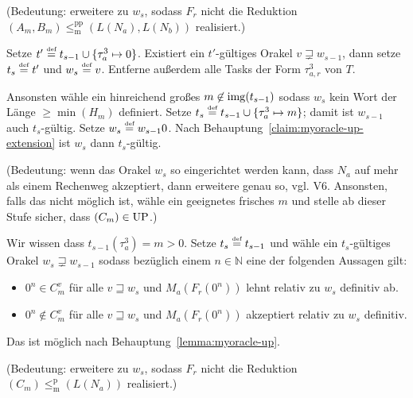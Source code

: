 \begin{description}[leftmargin=\parindent]
        (Bedeutung: erweitere zu $w_s$, sodass $F_r$ nicht die Reduktion $(A_m, B_m)\!\leq_\mathrm{m}^\mathrm{pp}\! (L(N_a), L(N_b))$ realisiert.) 

    \item[Task $\tau^3_{a}$:] Setze $t'\stackrel{\text{{\normalfont\tiny def}}}{=} t_{s-1}\cup\{\tau^3_{a}\mapsto 0\}$. Existiert ein $t'$-gültiges Orakel $v\sqsupsetneq w_{s-1}$, dann setze $t_s\stackrel{\text{{\normalfont\tiny def}}}{=} t'$ und $w_s\stackrel{\text{{\normalfont\tiny def}}}{=} v$. Entferne außerdem alle Tasks der Form $\tau^3_{a,r}$ von $T$.

    Ansonsten wähle ein hinreichend großes $m\not\in \operatorname{img}(t_{s-1})$ sodass $w_s$ kein Wort der Länge $\geq\min(H_m)$ definiert. Setze $t_s\stackrel{\text{{\normalfont\tiny def}}}{=} t_{s-1}\cup \{ \tau^3_{a}\mapsto m \}$; damit ist $w_{s-1}$ auch $t_s$-gültig. Setze $w_s\stackrel{\text{{\normalfont\tiny def}}}{=} w_{s-1}0$. Nach Behauptung~\ref{claim:myoracle-up-extension} ist $w_s$ dann $t_s$-gültig.

        (Bedeutung: wenn das Orakel $w_s$ so eingerichtet werden kann, dass $N_a$ auf mehr als einem Rechenweg akzeptiert, dann erweitere genau so, vgl. V6. Ansonsten, falls das nicht möglich ist, wähle ein geeignetes frisches $m$ und stelle ab dieser Stufe sicher, dass $(C_m)\in \mathrm{UP}$.) 

    \item[Task $\tau^3_{a,r}$:] Wir wissen dass $t_{s-1}(\tau^3_{a})=m>0$. Setze $t_s\stackrel{\text{{\normalfont\tiny def}}}{=} t_{s-1}$ und wähle ein $t_s$-gültiges Orakel $w_s\sqsupsetneq w_{s-1}$ sodass bezüglich einem $n\in\mathbb N$ eine der folgenden Aussagen gilt:
        \begin{itemize}[nosep,endpenalty=10000]
            \item $0^n\in C_m^v$ für alle $v\sqsupseteq w_s$ und $M_a(F_r(0^n))$ lehnt relativ zu $w_s$ definitiv ab.
            \item $0^n\not\in C_m^v$ für alle $v\sqsupseteq w_s$ und $M_a(F_r(0^n))$ akzeptiert relativ zu $w_s$ definitiv.
        \end{itemize} Das ist möglich nach Behauptung~\ref{lemma:myoracle-up}.

        (Bedeutung: erweitere zu $w_s$, sodass $F_r$ nicht die Reduktion $(C_m)\leq_\mathrm{m}^\mathrm{p} (L(N_a))$ realisiert.) 
\end{description}

